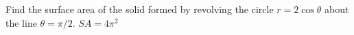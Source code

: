 {Find the surface area of the solid formed by revolving the circle $r=2\cos\theta$ about the line $\theta=\pi/2$.
}
{$SA = 4\pi^2$
}
